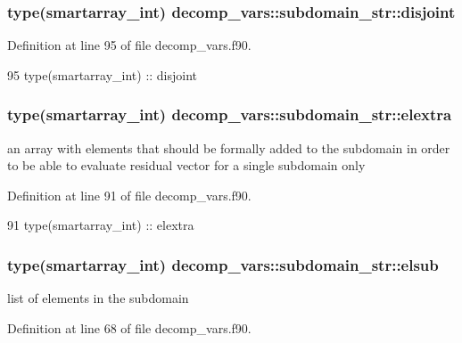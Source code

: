 \subsubsection[{disjoint}]{\setlength{\rightskip}{0pt plus 5cm}type({\bf smartarray\+\_\+int}) decomp\+\_\+vars\+::subdomain\+\_\+str\+::disjoint}\label{structdecomp__vars_1_1subdomain__str_a68215814f5ee467b1c92f9a1f2f0dcf4}


Definition at line 95 of file decomp\+\_\+vars.\+f90.


\begin{DoxyCode}
95     \textcolor{keywordtype}{type}(smartarray_int) :: disjoint    
\end{DoxyCode}
\subsubsection[{elextra}]{\setlength{\rightskip}{0pt plus 5cm}type({\bf smartarray\+\_\+int}) decomp\+\_\+vars\+::subdomain\+\_\+str\+::elextra}\label{structdecomp__vars_1_1subdomain__str_a18e4a17bd5f12a6243f4cd85c3c6e364}


an array with elements that should be formally added to the subdomain in order to be able to evaluate residual vector for a single subdomain only 



Definition at line 91 of file decomp\+\_\+vars.\+f90.


\begin{DoxyCode}
91     \textcolor{keywordtype}{type}(smartarray_int) :: elextra
\end{DoxyCode}
\subsubsection[{elsub}]{\setlength{\rightskip}{0pt plus 5cm}type({\bf smartarray\+\_\+int}) decomp\+\_\+vars\+::subdomain\+\_\+str\+::elsub}\label{structdecomp__vars_1_1subdomain__str_a22ac9c28d0f5e371fbda4ffdf9e18902}


list of elements in the subdomain 



Definition at line 68 of file decomp\+\_\+vars.\+f90.


